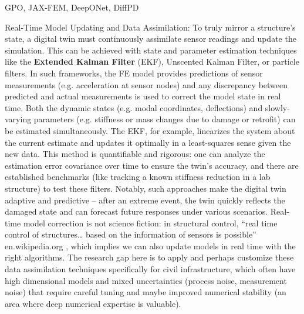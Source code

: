 GPO, JAX-FEM, DeepONet, DiffPD


Real-Time Model Updating and Data Assimilation: To truly mirror a structure’s state, a digital twin must continuously assimilate sensor readings and update the simulation. 
This can be achieved with state and parameter estimation techniques like the \textbf{Extended Kalman Filter} (EKF), Unscented Kalman Filter, or particle filters. 
In such frameworks, the FE model provides predictions of sensor measurements (e.g. acceleration at sensor nodes) and any discrepancy between predicted and actual measurements is used to correct the model state in real time. 
Both the dynamic states (e.g. modal coordinates, deflections) and slowly-varying parameters (e.g. stiffness or mass changes due to damage or retrofit) can be estimated simultaneously. 
The EKF, for example, linearizes the system about the current estimate and updates it optimally in a least-squares sense given the new data. 
This method is quantifiable and rigorous: one can analyze the estimation error covariance over time to ensure the twin’s accuracy, and there are established benchmarks (like tracking a known stiffness reduction in a lab structure) to test these filters. Notably, such approaches make the digital twin adaptive and predictive – after an extreme event, the twin quickly reflects the damaged state and can forecast future responses under various scenarios. Real-time model correction is not science fiction: in structural control, “real time control of structures… based on the information of sensors is possible”
en.wikipedia.org
, which implies we can also update models in real time with the right algorithms. The research gap here is to apply and perhaps customize these data assimilation techniques specifically for civil infrastructure, which often have high dimensional models and mixed uncertainties (process noise, measurement noise) that require careful tuning and maybe improved numerical stability (an area where deep numerical expertise is valuable).

